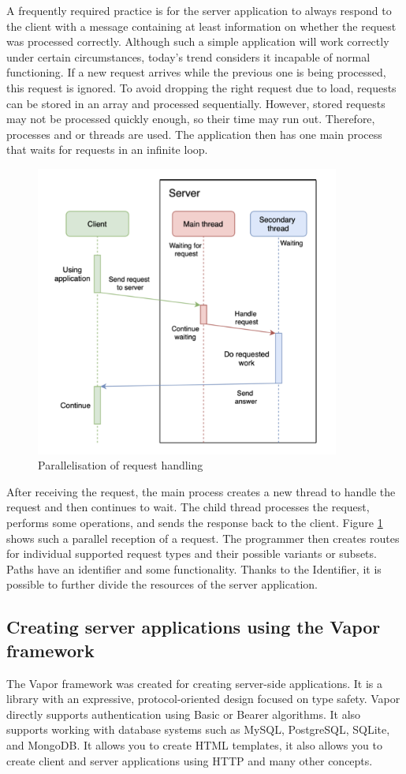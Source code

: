 \documentclass[
  biblatex = false,
  language=english,
  figures=false,
  sourcecodes,
  glossaries,
  index
]{kidiplom}
\begin{document}
A frequently required practice is for the server application to always respond to the client with a message containing at least information on whether the request was processed correctly.
Although such a simple application will work correctly under certain circumstances, today's trend considers it incapable of normal functioning. If a new request arrives while the previous one is being processed, this request is ignored. To avoid dropping the right request due to load, requests can be stored in an array and processed sequentially. However, stored requests may not be processed quickly enough, so their time may run out. Therefore, processes and or threads are used. The application then has one main process that waits for requests in an infinite loop.

\begin{figure}[h!]
\centering
\includegraphics[width=10cm]{image1}
\caption{Parallelisation of request handling}
\label{fig:image1}
\end{figure}

After receiving the request, the main process creates a new thread to handle the request and then continues to wait. The child thread processes the request, performs some operations, and sends the response back to the client. Figure \ref{fig:image1} shows such a parallel reception of a request. The programmer then creates routes for individual supported request types and their possible variants or subsets. Paths have an identifier and some functionality. Thanks to the Identifier, it is possible to further divide the resources of the server application.

\subsection{Creating server applications using the Vapor framework}
The Vapor framework was created for creating server-side applications. It is a library with an expressive, protocol-oriented design focused on type safety. Vapor directly supports authentication using Basic or Bearer algorithms. It also supports working with database systems such as MySQL, PostgreSQL, SQLite, and MongoDB. It allows you to create HTML templates, it also allows you to create client and server applications using HTTP and many other concepts.
\end{document}
